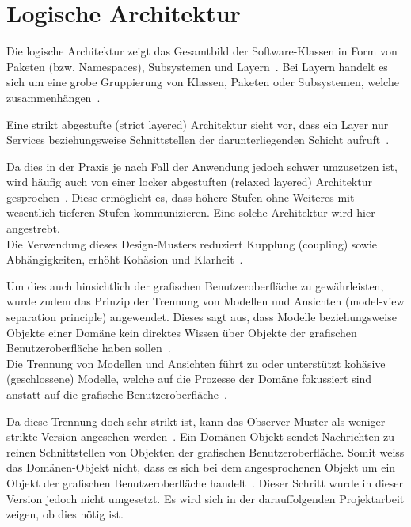
\section{Logische Architektur}
\label{sec:logical-architecture}

Die logische Architektur zeigt das Gesamtbild der Software-Klassen in Form von
Paketen (bzw. Namespaces), Subsystemen und Layern~\cite[S. 199]{larman_applying_2004}.
Bei Layern handelt es sich um eine grobe Gruppierung von Klassen, Paketen oder
Subsystemen, welche zusammenhängen~\cite[S. 199]{larman_applying_2004}.

Eine strikt abgestufte (strict layered) Architektur sieht vor, dass ein Layer
nur Services beziehungsweise Schnittstellen der darunterliegenden Schicht
aufruft~\cite[S. 200]{larman_applying_2004}.

Da dies in der Praxis je nach Fall der Anwendung jedoch schwer umzusetzen ist,
wird häufig auch von einer locker abgestuften (relaxed layered) Architektur
gesprochen~\cite[S.  200]{larman_applying_2004}. Diese ermöglicht es, dass
höhere Stufen ohne Weiteres mit wesentlich tieferen Stufen kommunizieren. Eine
solche Architektur wird hier angestrebt.\\
Die Verwendung dieses Design-Musters reduziert Kupplung (coupling) sowie
Abhängigkeiten, erhöht Kohäsion und Klarheit~\cite[S.
204]{larman_applying_2004}.

Um dies auch hinsichtlich der grafischen Benutzeroberfläche zu gewährleisten,
wurde zudem das Prinzip der Trennung von Modellen und Ansichten (model-view
separation principle) angewendet. Dieses sagt aus, dass Modelle beziehungsweise
Objekte einer Domäne kein direktes Wissen über Objekte der grafischen
Benutzeroberfläche haben sollen~\cite[S.  209]{larman_applying_2004}.\\
Die Trennung von Modellen und Ansichten führt zu oder unterstützt kohäsive
(geschlossene) Modelle, welche auf die Prozesse der Domäne fokussiert sind
anstatt auf die grafische Benutzeroberfläche~\cite[S.
210]{larman_applying_2004}.

Da diese Trennung doch sehr strikt ist, kann das Observer-Muster als weniger
strikte Version angesehen werden~\cite[S. 210]{larman_applying_2004}. Ein
Domänen-Objekt sendet Nachrichten zu reinen Schnittstellen von Objekten der
grafischen Benutzeroberfläche. Somit weiss das Domänen-Objekt nicht, dass es
sich bei dem angesprochenen Objekt um ein Objekt der grafischen
Benutzeroberfläche handelt~\cite[S. 210]{larman_applying_2004}.
Dieser Schritt wurde in dieser Version jedoch nicht umgesetzt. Es wird sich in
der darauffolgenden Projektarbeit zeigen, ob dies nötig ist.

